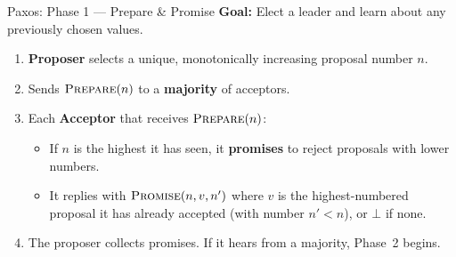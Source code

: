 \documentclass[11pt,aspectratio=169]{beamer}
\begin{document}
\begin{frame}{Paxos: Phase 1 --- Prepare \& Promise}
\textbf{Goal:} Elect a leader and learn about any previously chosen values.

\vspace{8pt}
\begin{enumerate}
  \item<2-> \textbf{Proposer} selects a unique, monotonically increasing proposal number $n$.
  \item<3-> Sends $\textsc{Prepare}(n)$ to a \textbf{majority} of acceptors.
  \item<4-> Each \textbf{Acceptor} that receives $\textsc{Prepare}(n)$:
    \begin{itemize}
      \item If $n$ is the highest it has seen, it \textbf{promises} to reject proposals with lower numbers.
      \item It replies with $\textsc{Promise}(n, v, n')$ where $v$ is the highest-numbered proposal it has already accepted (with number $n' < n$), or $\bot$ if none.
    \end{itemize}
  \item<5-> The proposer collects promises. If it hears from a majority, Phase~2 begins.
\end{enumerate}

\vspace{6pt}
\end{frame}
\end{document}

